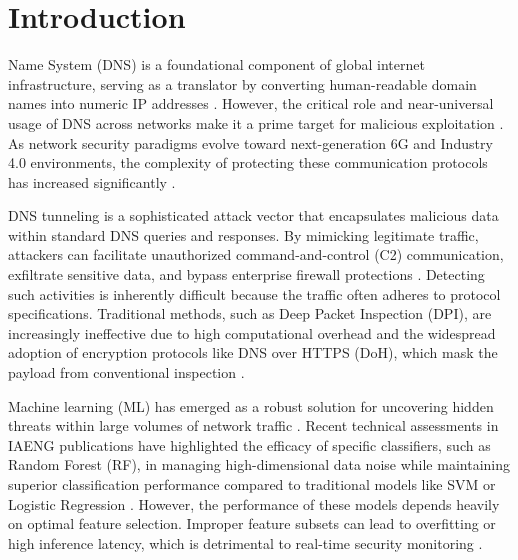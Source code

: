 \documentclass[journal]{IAENGtran}
\begin{document}
%
\IAENGpeerreviewmaketitle


\section{Introduction}

 Name System (DNS) is a foundational component of global internet infrastructure, serving as a translator by converting human-readable domain names into numeric IP addresses \cite{hynek2022summary}. However, the critical role and near-universal usage of DNS across networks make it a prime target for malicious exploitation \cite{afek2025pops, li2025harnessing}. As network security paradigms evolve toward next-generation 6G and Industry 4.0 environments, the complexity of protecting these communication protocols has increased significantly \cite{li2025harnessing}.



DNS tunneling is a sophisticated attack vector that encapsulates malicious data within standard DNS queries and responses. By mimicking legitimate traffic, attackers can facilitate unauthorized command-and-control (C2) communication, exfiltrate sensitive data, and bypass enterprise firewall protections \cite{jerabek2023dns, gursoy2024dns}. Detecting such activities is inherently difficult because the traffic often adheres to protocol specifications. Traditional methods, such as Deep Packet Inspection (DPI), are increasingly ineffective due to high computational overhead and the widespread adoption of encryption protocols like DNS over HTTPS (DoH), which mask the payload from conventional inspection \cite{boonyopakorn2024malicious, alzighaibi2023detection}.

Machine learning (ML) has emerged as a robust solution for uncovering hidden threats within large volumes of network traffic \cite{mahmood2024optimizing}. Recent technical assessments in IAENG publications have highlighted the efficacy of specific classifiers, such as Random Forest (RF), in managing high-dimensional data noise while maintaining superior classification performance compared to traditional models like SVM or Logistic Regression \cite{elkhadir2024enhancing}. However, the performance of these models depends heavily on optimal feature selection. Improper feature subsets can lead to overfitting or high inference latency, which is detrimental to real-time security monitoring \cite{liu2025intrusion}.
\end{document}
